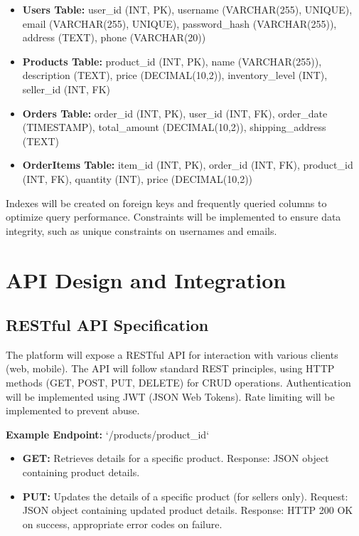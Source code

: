 \documentclass[11pt,a4paper,oneside]{article}
\begin{document}
\begin{itemize}
    \item \textbf{Users Table:}  user\_id (INT, PK), username (VARCHAR(255), UNIQUE), email (VARCHAR(255), UNIQUE), password\_hash (VARCHAR(255)), address (TEXT), phone (VARCHAR(20))
    \item \textbf{Products Table:} product\_id (INT, PK), name (VARCHAR(255)), description (TEXT), price (DECIMAL(10,2)), inventory\_level (INT), seller\_id (INT, FK)
    \item \textbf{Orders Table:} order\_id (INT, PK), user\_id (INT, FK), order\_date (TIMESTAMP), total\_amount (DECIMAL(10,2)), shipping\_address (TEXT)
    \item \textbf{OrderItems Table:} item\_id (INT, PK), order\_id (INT, FK), product\_id (INT, FK), quantity (INT), price (DECIMAL(10,2))
\end{itemize}
Indexes will be created on foreign keys and frequently queried columns to optimize query performance.  Constraints will be implemented to ensure data integrity, such as unique constraints on usernames and emails.

\section{API Design and Integration}

\subsection{RESTful API Specification}

The platform will expose a RESTful API for interaction with various clients (web, mobile).  The API will follow standard REST principles, using HTTP methods (GET, POST, PUT, DELETE) for CRUD operations.  Authentication will be implemented using JWT (JSON Web Tokens).  Rate limiting will be implemented to prevent abuse.

\textbf{Example Endpoint:}  `/products/{product_id}`

\begin{itemize}
    \item \textbf{GET:} Retrieves details for a specific product.  Response: JSON object containing product details.
    \item \textbf{PUT:} Updates the details of a specific product (for sellers only).  Request: JSON object containing updated product details.  Response:  HTTP 200 OK on success, appropriate error codes on failure.
\end{itemize}
\end{document}
